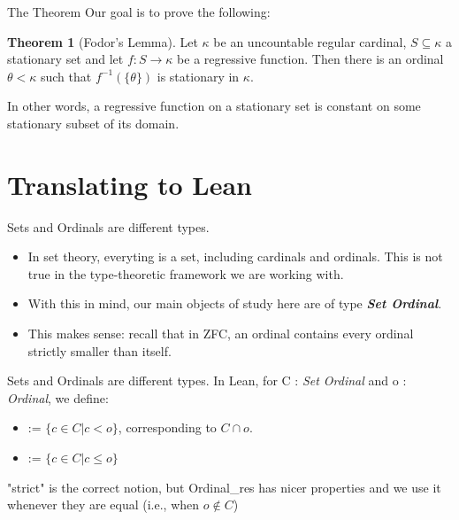\documentclass{beamer}
\theoremstyle{definition}
\newtheorem{thm}[subsection]{Theorem}
\begin{document}
\begin{frame}{The Theorem}
    Our goal is to prove the following:
    \begin{thm}[Fodor's Lemma]
       Let $\kappa$ be an uncountable regular cardinal, $S\subseteq\kappa$ a stationary set and let $f:S\rightarrow \kappa$ be a regressive function. Then there is an ordinal $\theta <\kappa$ such that $f^{-1}(\{\theta\})$ is stationary in $\kappa$.
    \end{thm}\pause
    In other words, a regressive function on a stationary set is constant on some stationary subset of its domain.
\end{frame}

\section{Translating to Lean}

\begin{frame}{Sets and Ordinals are different types.}
    \begin{itemize}
        \item In set theory, everyting is a set, including cardinals and ordinals. This is not true in the type-theoretic framework we are working with. \pause
        \item With this in mind, our main objects of study here are of type \textit{\textbf{Set Ordinal}}. \pause
        \item This makes sense: recall that in ZFC, an ordinal contains every ordinal strictly smaller than itself.
    \end{itemize}
\end{frame}

\begin{frame}{Sets and Ordinals are different types.}
    In Lean, for C : \textit{Set Ordinal} and o : \textit{Ordinal}, we define:
    \begin{itemize}
        \item {} := $\{c\in C | c < o\}$, corresponding to $C\cap o.$ \pause
        \item {} := $\{c\in C | c \leq o\}$ \pause
    \end{itemize}
    "strict" is the correct notion, but Ordinal\_res has nicer properties and we use it whenever they are equal (i.e., when $o\notin C$)
\end{frame}
\end{document}
